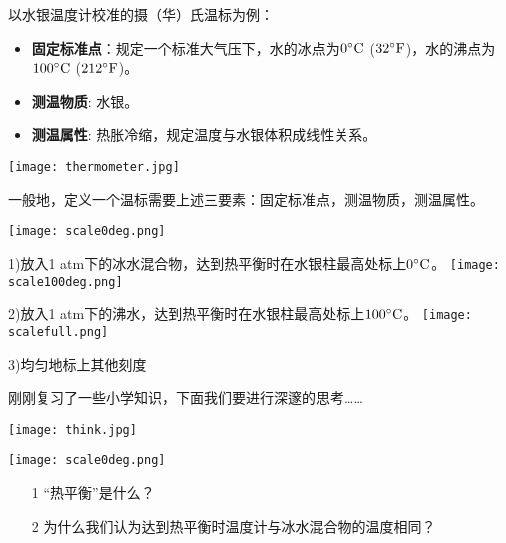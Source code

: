 \documentclass[CJK]{beamer}
\begin{document}
\begin{frame}
\bch
以水银温度计校准的摄（华）氏温标为例：
\begin{itemize}
\item{{\bf 固定标准点}：规定一个标准大气压下，水的冰点为$0^\circ \mathrm{C}$ ($32{^\circ \mathrm{F}}$)，水的沸点为$100^\circ \mathrm{C}$ ($212{^\circ \mathrm{F}}$)。}
\item{{\bf 测温物质}: 水银。}
\item{{\bf 测温属性}: 热胀冷缩，规定温度与水银体积成线性关系。} 
\end{itemize}
\emini
{}
\texttt{[image: thermometer.jpg]}
\emini

\skipline

一般地，定义一个温标需要上述三要素：固定标准点，测温物质，测温属性。
\ech
\end{frame}

\begin{frame}
\bch
{}
\texttt{[image: scale0deg.png]}

{\scriptsize 1)放入1 atm下的冰水混合物，达到热平衡时在水银柱最高处标上$0^\circ \mathrm{C}$。}
\emini
\hspace{0.1in}
\texttt{[image: scale100deg.png]}

{\vskip 0.3in}

{\scriptsize 2)放入1 atm下的沸水，达到热平衡时在水银柱最高处标上$100^\circ \mathrm{C}$。}
\emini
\hspace{0.1in}
\texttt{[image: scalefull.png]}

{\vskip 0.3in}

{\scriptsize 3)均匀地标上其他刻度

\vspace{0.36in} 

}
\emini
\ech
\end{frame}

\begin{frame}
\bch
刚刚复习了一些小学知识，下面我们要进行深邃的思考……

\begin{center}\texttt{[image: think.jpg]}\end{center}
\ech
\end{frame}


\begin{frame}
\bch
{}
\texttt{[image: scale0deg.png]}
\emini
{}
\begin{itemize}
\item[1]{ “热平衡”是什么？}
\item[2]{ 为什么我们认为达到热平衡时温度计与冰水混合物的温度相同？}
\end{itemize}
\emini
\ech
\end{frame}
\end{document}
